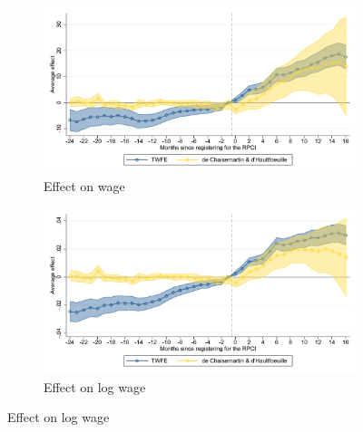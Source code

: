 \documentclass[oneside,11pt]{article}
\begin{document}
\begin{figure}[H]
    \begin{subfigure}{0.49\textwidth}
    \caption{Effect on wage}
    \includegraphics[width=\textwidth]{04_Figures/muestra_10porciento/event_study_sal_cierre_connected.pdf}
    \end{subfigure}
    \begin{subfigure}{0.49\textwidth}
    \caption{Effect on log wage}
    \includegraphics[width=\textwidth]{04_Figures/muestra_10porciento/event_study_log_sal_cierre_connected.pdf}
    \end{subfigure}
    
\end{figure}
\end{document}
